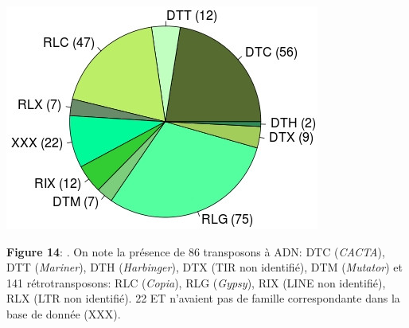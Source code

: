 \documentclass[a4paper, 12pt]{article}
\begin{document}
\begin{onehalfspace}
\begin{multicols}{3}
\begin{center}
\includegraphics[scale=0.4]{pic_Data/fig13.jpeg}\\
\end{center}
\textbf{Figure 14}: . On note la présence de 86 transposons à ADN: DTC (\textit{CACTA}), DTT (\textit{Mariner}), DTH (\textit{Harbinger}), DTX (TIR non identifié), DTM (\textit{Mutator}) et 141 rétrotransposons: RLC (\textit{Copia}), RLG (\textit{Gypsy}), RIX (LINE non identifié), RLX (LTR non identifié). 22 ET n'avaient pas de famille correspondante dans la base de donnée (XXX).


\end{multicols}
\end{onehalfspace}
\end{document}
